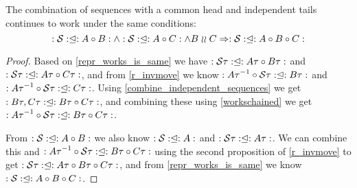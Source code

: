 \begin{mylem}\label{indep_prefix_combine}
The combination of sequences with a common head and independent tails 
continues to work under the same conditions:
\[ \worksc{A\cc B}{\seqset{S}} \wedge \worksc{A\cc C}{\seqset{S}} \wedge B\indep C \Rightarrow \worksc{A\cc B\cc C}{\seqset{S}} \]
\end{mylem}
\begin{proof}
Based on \cref{repr_works_is_same} we have
$\worksc{A\T\cc B\T}{\seqset{S\T}}$ and $\worksc{A\T\cc C\T}{\seqset{S\T}}$,
and from \cref{r_invmove} we know
$\worksc{B\T}{{A\T}^{-1}\cc \seqset{S\T}}$ and $\worksc{C\T}{{A\T}^{-1}\cc \seqset{S\T}}$.
Using \cref{combine_independent_sequences} we get
$\worksc{B\T\cc C\T}{B\T,C\T}$,
and combining these using \cref{workschained}
we get
$\worksc{B\T\cc C\T}{{A\T}^{-1}\cc \seqset{S\T}}$.

From $\worksc{A\cc B}{\seqset{S}}$ we also know $\worksc{A}{\seqset{S}}$ and $\worksc{A\T}{\seqset{S\T}}$.
We can combine this and $\worksc{B\T\cc C\T}{{A\T}^{-1}\cc \seqset{S\T}}$ using
the second proposition of \cref{r_invmove} to get
$\worksc{A\T\cc B\T\cc C\T}{\seqset{S\T}}$, and from \cref{repr_works_is_same} we know
$\worksc{A\cc B\cc C}{\seqset{S}}$.
\end{proof}
